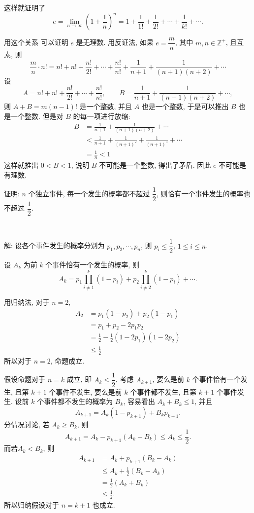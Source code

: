 这样就证明了
\[e =  \lim_{n\to\infty}\left(1+\frac{1}{n}\right)^n = 1 + \frac{1}{1!} + \frac{1}{2!} + \cdots + \frac{1}{k!} + \cdots .\]

用这个关系 可以证明 $e$ 是无理数. 用反证法, 如果 $e = \dfrac{m}{n}$, 其中 $m,n\in\mathbb{Z}^+$, 且互素, 则
\[\frac{m}{n}\cdot n! = n! + n! + \frac{n!}{2!} + \cdots + \frac{n!}{n!} + \frac{1}{n+1} + \frac{1}{(n+1)(n+2)} + \cdots \]
设 
$$A = n!+n!+\dfrac{n!}{2!}+\cdots+\dfrac{n!}{n!}, \qquad B = \frac{1}{n+1} + \frac{1}{(n+1)(n+2)} + \cdots,$$ 
则 $A+B = m(n-1)!$ 是一个整数, 并且 $A$ 也是一个整数, 于是可以推出 $B$ 也是一个整数. 但是对 $B$ 的每一项进行放缩:
\begin{align*}
B &= \frac{1}{n+1} + \frac{1}{(n+1)(n+2)} + \cdots \\
& < \frac{1}{n+1} + \frac{1}{(n+1)^2} +  \frac{1}{(n+1)^3} + \cdots \\
&= \frac{1}{n} < 1
\end{align*}
这样就推出 $0 < B < 1$, 说明 $B$ 不可能是一个整数, 得出了矛盾. 因此 $e$ 不可能是有理数.

\newpage

证明: $n$ 个独立事件, 每一个发生的概率都不超过 $\dfrac{1}{2}$, 则恰有一个事件发生的概率也不超过 $\dfrac{1}{2}$.

~

解: 设各个事件发生的概率分别为 $p_1, p_2, \cdots, p_n$, 则 $p_i \le \dfrac{1}{2}$, $1\le i \le n$. 

设 $A_k$ 为前 $k$ 个事件恰有一个发生的概率, 则
\[ A_k = p_1\prod_{i\neq 1}^k(1-p_i) + p_2\prod_{i\neq 2}^k(1-p_i) + \cdots .\]

用归纳法, 对于  $n=2$, 
\begin{align*} 
A_2 &= p_1(1-p_2) + p_2(1-p_1) \\
&= p_1+p_2-2p_1p_2 \\
&= \frac{1}{2}-\frac{1}{2}(1-2p_1)(1-2p_2) \\
& \le \frac{1}{2}
\end{align*}
所以对于 $n=2$, 命题成立.

假设命题对于 $n=k$ 成立, 即 $A_k \le \dfrac{1}{2}$, 考虑 $A_{k+1}$, 要么是前 $k$ 个事件恰有一个发生, 且第 $k+1$ 个事件不发生, 要么是前 $k$ 个事件都不发生, 且第 $k+1$ 个事件发生. 设前 $k$ 个事件都不发生的概率为 $B_k$, 容易看出 $A_k + B_k \le 1$, 并且
\[A_{k+1} = A_k(1-p_{k+1}) + B_kp_{k+1} .\]
分情况讨论, 若 $A_k \ge B_k$, 则 
\[ A_{k+1} = A_k - p_{k+1}(A_k-B_k) \le A_k \le \frac{1}{2}.\]
而若$A_k < B_k$, 则
\begin{align*} 
A_{k+1} &= A_k + p_{k+1}(B_k-A_k) \\
&\le A_k + \frac{1}{2}(B_k-A_k) \\
& = \frac{1}{2}(A_k+B_k) \\
&\le \frac{1}{2} .
\end{align*}
所以归纳假设对于 $n=k+1$ 也成立.

